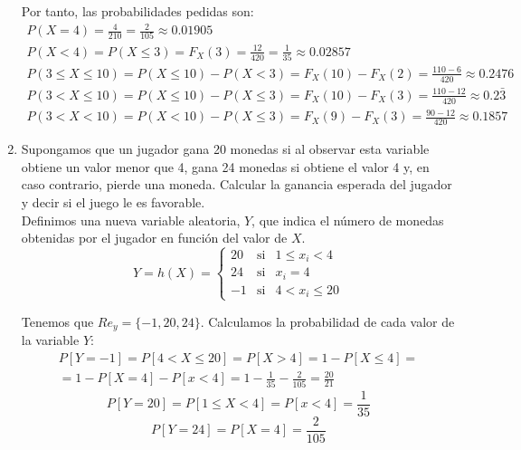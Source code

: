 \begin{ejercicio}
\begin{enumerate}
        Por tanto, las probabilidades pedidas son:
        \begin{gather*}
            P(X=4) = \frac{4}{210} = \frac{2}{105}\approx 0.01905 
            \\
            P(X<4) = P(X\leq 3) =F_X(3) = \frac{12}{420} = \frac{1}{35} \approx 0.02857
            \\
            P(3\leq X \leq 10) = P(X\leq 10) - P(X<3 ) = F_X(10) - F_X(2) = \frac{110-6}{420}\approx 0.2476
            \\
            P(3< X \leq 10) = P(X\leq 10) - P(X\leq3 ) = F_X(10) - F_X(3) = \frac{110-12}{420}\approx 0.2\bar{3}
            \\
            P(3< X < 10) = P(X< 10) - P(X\leq 3 ) = F_X(9) - F_X(3) = \frac{90-12}{420}\approx 0.1857
        \end{gather*}

        \item Supongamos que un jugador gana 20 monedas si al observar esta variable obtiene un valor menor que 4, gana 24 monedas si obtiene el valor 4 y, en caso contrario, pierde una moneda. Calcular la ganancia esperada del jugador y decir si el juego le es favorable.\\

        Definimos una nueva variable aleatoria, $Y$, que indica el número de monedas obtenidas por el jugador en función del valor de $X$.
        \begin{equation*}
            Y=h(X) = \left\{\begin{array}{llc}
                20 & \text{si} & 1\leq  x_i < 4\\
                24 & \text{si} & x_i = 4\\
                -1 & \text{si} & 4 < x_i \leq 20 
            \end{array}\right.
        \end{equation*}

        Tenemos que $Re_y = \{-1, 20, 24\}$. Calculamos la probabilidad de cada valor de la variable $Y$:
        \begin{multline*}
            P[Y=-1] = P[4 < X \leq 20] = P[X > 4] = 1- P[X\leq 4] =\\= 1-P[X=4] - P[x<4] = 1-\frac{1}{35} - \frac{2}{105} = \frac{20}{21}
        \end{multline*}
        \begin{equation*}
            P[Y=20] = P[1\leq X < 4] = P[x<4] = \frac{1}{35}
        \end{equation*}
        \begin{equation*}
            P[Y=24] = P[X=4] = \frac{2}{105}
        \end{equation*}


\end{enumerate}
\end{ejercicio}
